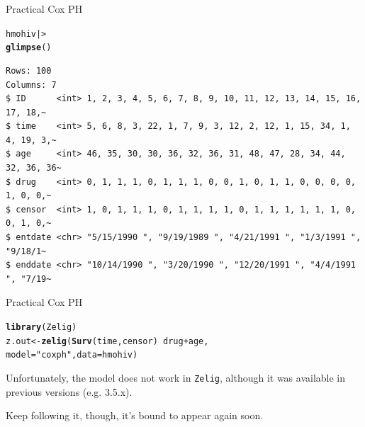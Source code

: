 \documentclass[12pt,english,pdf,xcolor=dvipsnames,aspectratio=169,handout]{beamer}\usepackage[]{graphicx}\usepackage[]{xcolor}
\makeatletter
\newcommand{\hlstr}[1]{\textcolor[rgb]{0.192,0.494,0.8}{#1}}%
\newcommand{\hlopt}[1]{\textcolor[rgb]{0,0,0}{#1}}%
\newcommand{\hlstd}[1]{\textcolor[rgb]{0.345,0.345,0.345}{#1}}%
\newcommand{\hlkwb}[1]{\textcolor[rgb]{0.69,0.353,0.396}{#1}}%
\newcommand{\hlkwc}[1]{\textcolor[rgb]{0.333,0.667,0.333}{#1}}%
\newcommand{\hlkwd}[1]{\textcolor[rgb]{0.737,0.353,0.396}{\textbf{#1}}}%
\newenvironment{kframe}{%
 \def\at@end@of@kframe{}%
 \ifinner\ifhmode%
  \def\at@end@of@kframe{\end{minipage}}%
  \begin{minipage}{\columnwidth}%
 \fi\fi%
 \def\FrameCommand##1{\hskip\@totalleftmargin \hskip-\fboxsep
 \colorbox{shadecolor}{##1}\hskip-\fboxsep
     \hskip-\linewidth \hskip-\@totalleftmargin \hskip\columnwidth}%
 \MakeFramed {\advance\hsize-\width
   \@totalleftmargin\z@ \linewidth\hsize
   \@setminipage}}%
 {\par\unskip\endMakeFramed%
 \at@end@of@kframe}
\newenvironment{knitrout}{}{} %
\makeatother
\begin{document}
\begin{frame}[fragile]{Practical Cox PH}
\begin{knitrout}\scriptsize
{}\color{fgcolor}\begin{kframe}
\begin{alltt}
\hlstd{hmohiv |>}
  \hlkwd{glimpse}\hlstd{()}
\end{alltt}
\begin{verbatim}
Rows: 100
Columns: 7
$ ID      <int> 1, 2, 3, 4, 5, 6, 7, 8, 9, 10, 11, 12, 13, 14, 15, 16, 17, 18,~
$ time    <int> 5, 6, 8, 3, 22, 1, 7, 9, 3, 12, 2, 12, 1, 15, 34, 1, 4, 19, 3,~
$ age     <int> 46, 35, 30, 30, 36, 32, 36, 31, 48, 47, 28, 34, 44, 32, 36, 36~
$ drug    <int> 0, 1, 1, 1, 0, 1, 1, 1, 0, 0, 1, 0, 1, 1, 0, 0, 0, 0, 1, 0, 0,~
$ censor  <int> 1, 0, 1, 1, 1, 0, 1, 1, 1, 1, 0, 1, 1, 1, 1, 1, 1, 0, 0, 1, 0,~
$ entdate <chr> "5/15/1990 ", "9/19/1989 ", "4/21/1991 ", "1/3/1991 ", "9/18/1~
$ enddate <chr> "10/14/1990 ", "3/20/1990 ", "12/20/1991 ", "4/4/1991 ", "7/19~
\end{verbatim}
\end{kframe}
\end{knitrout}

\end{frame}



\begin{frame}[fragile]{Practical Cox PH}

\begin{knitrout}\scriptsize
{}\color{fgcolor}\begin{kframe}
\begin{alltt}
\hlkwd{library}\hlstd{(Zelig)}
\hlstd{z.out} \hlkwb{<-} \hlkwd{zelig}\hlstd{(}\hlkwd{Surv}\hlstd{(time, censor)} \hlopt{~} \hlstd{drug} \hlopt{+} \hlstd{age,}
               \hlkwc{model} \hlstd{=} \hlstr{"coxph"}\hlstd{,} \hlkwc{data} \hlstd{= hmohiv)}
\end{alltt}
\end{kframe}
\end{knitrout}
\bigskip

Unfortunately, the model does not work in \texttt{Zelig}, although it was available in previous versions (e.g. 3.5.x).\bigskip

Keep following it, though, it's bound to appear again soon.
\end{frame}
\end{document}
